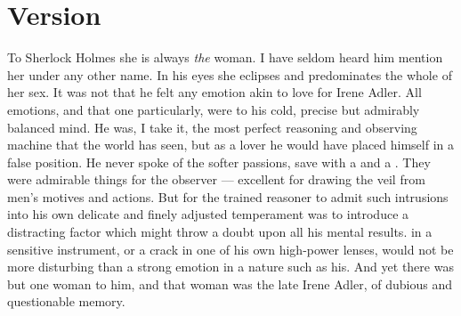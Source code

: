 \documentclass{fiche}
\begin{document}

\newpage
\section{Version}

\begin{version}
To Sherlock Holmes she is always \emph{the} woman. I have seldom heard him mention her under
any other name. In his eyes she eclipses and predominates the whole of her sex. It was not
that he felt any emotion akin to love for Irene Adler. All emotions, and that one
particularly, were  to his cold, precise but
admirably balanced mind. He was, I take it, the most perfect reasoning and observing machine
that the world has seen, but as a lover he would have placed himself in a false position. He
never spoke of the softer passions, save with a  and a
. They were admirable things for the observer ---
excellent for drawing the veil from men's motives and actions. But for the trained reasoner
to admit such intrusions into his own delicate and finely adjusted temperament was to
introduce a distracting factor which might throw a doubt upon all his mental results.
 in a sensitive instrument, or a crack in one of his
own high-power lenses, would not be more disturbing than a strong emotion in a nature such as
his. And yet there was but one woman to him, and that woman was the late Irene Adler, of
dubious and questionable memory.
\end{version}

\end{document}
